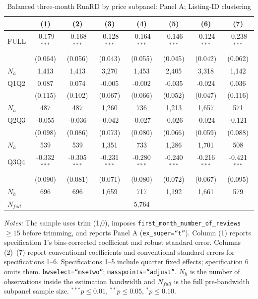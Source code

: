 \begin{table}[!htbp]
\centering
\caption{Balanced three-month RunRD by price subpanel: Panel A; Listing-ID clustering}
\scriptsize
\setlength{\tabcolsep}{5pt}
\begin{tabular}{l*{7}{c}}
\toprule
 & (1) & (2) & (3) & (4) & (5) & (6) & (7) \\
\midrule
FULL & -0.179$^{***}$ & -0.168$^{***}$ & -0.128$^{***}$ & -0.164$^{***}$ & -0.146$^{***}$ & -0.124$^{***}$ & -0.238$^{***}$ \\
 & (0.064) & (0.056) & (0.043) & (0.055) & (0.045) & (0.042) & (0.062) \\
$N_h$ & 1,413 & 1,413 & 3,270 & 1,453 & 2,405 & 3,318 & 1,142 \\
\addlinespace
Q1Q2 & 0.087 & 0.074 & -0.005 & -0.002 & -0.035 & -0.024 & 0.036 \\
 & (0.115) & (0.102) & (0.067) & (0.066) & (0.052) & (0.047) & (0.116) \\
$N_h$ & 487 & 487 & 1,260 & 736 & 1,213 & 1,657 & 571 \\
\addlinespace
Q2Q3 & -0.055 & -0.036 & -0.042 & -0.027 & -0.026 & -0.024 & -0.121 \\
 & (0.098) & (0.086) & (0.073) & (0.080) & (0.066) & (0.059) & (0.088) \\
$N_h$ & 539 & 539 & 1,351 & 733 & 1,286 & 1,701 & 508 \\
\addlinespace
Q3Q4 & -0.332$^{***}$ & -0.305$^{***}$ & -0.231$^{***}$ & -0.280$^{***}$ & -0.240$^{***}$ & -0.216$^{***}$ & -0.421$^{***}$ \\
 & (0.090) & (0.081) & (0.071) & (0.080) & (0.072) & (0.067) & (0.095) \\
$N_h$ & 696 & 696 & 1,659 & 717 & 1,192 & 1,661 & 579 \\

\midrule
$N_{full}$ & \multicolumn{7}{c}{5,764} \\
\bottomrule
\end{tabular}
\begin{minipage}{0.98\textwidth}
\footnotesize
\textit{Notes:} The sample uses trim (1,0), imposes \texttt{first\_month\_number\_of\_reviews}$\geq15$ before trimming, and reports Panel A (\texttt{ex\_super=``t''}). Column (1) reports specification 1's bias-corrected coefficient and robust standard error. Columns (2)--(7) report conventional coefficients and conventional standard errors for specifications 1--6. Specifications 1--5 include quarter fixed effects; specification 6 omits them. \texttt{bwselect=``msetwo''}; \texttt{masspoints=``adjust''}. $N_h$ is the number of observations inside the estimation bandwidth and $N_{full}$ is the full pre-bandwidth subpanel sample size. $^{***}p\leq0.01$, $^{**}p\leq0.05$, $^{*}p\leq0.10$.
\end{minipage}
\end{table}
\clearpage

